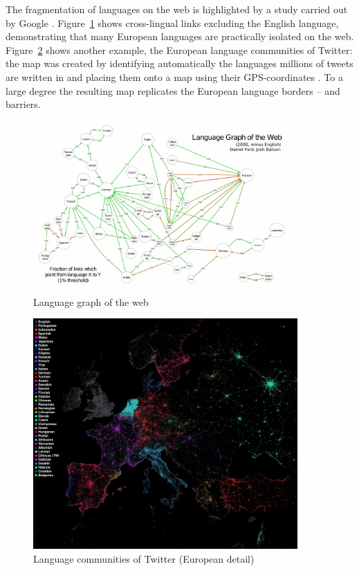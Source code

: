 \documentclass[10pt, plain]{../../metanetpaper}
\begin{document}
\begin{multicols}{2}
The fragmentation of languages on the web is highlighted by a study carried out by Google \cite{Ford11}. Figure~\ref{fig:language-graph-of-the-web} shows cross-lingual links excluding the English language, demonstrating that many European languages are practically isolated on the web.  Figure~\ref{fig:european-languages-in-twitter} shows another example, the European language communities of Twitter: the map was created by identifying automatically the languages millions of tweets are written in and placing them onto a map using their GPS-coordinates \cite{fisher11}. To a large degree the resulting map replicates the European language borders -- and barriers.

\begin{figure}[htb]
  \center
  \includegraphics[width=0.9\textwidth]{../_media/Language-Graph}
  \caption{Language graph of the web}
  \label{fig:language-graph-of-the-web}
\end{figure}

\begin{figure}[htb]
  \center
  \includegraphics[width=0.9\textwidth]{../_media/twitter-languages-europe}
  \caption{Language communities of Twitter (European detail)}
  \label{fig:european-languages-in-twitter}
\end{figure}


\end{multicols}
\end{document}

